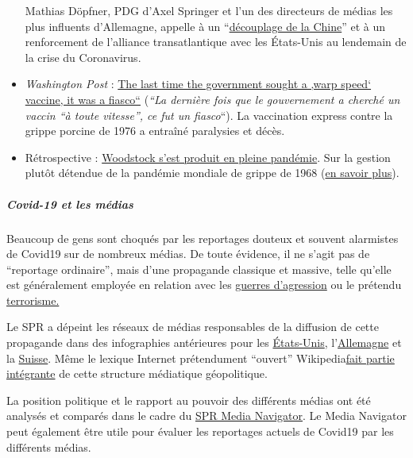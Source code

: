 \begin{itemize}
  Mathias Döpfner, PDG d'Axel Springer et l'un des directeurs de médias
  les plus influents d'Allemagne, appelle à un
  ``\href{https://www.german-foreign-policy.com/news/detail/8263/}{découplage
  de la Chine}'' et à un renforcement de l'alliance transatlantique avec
  les États-Unis au lendemain de la crise du Coronavirus.
\item
  \emph{Washington Post} :
  \href{https://www.washingtonpost.com/history/2020/05/01/vaccine-swine-flu-coronavirus/}{The
  last time the government sought a ‚warp speed` vaccine, it was a
  fiasco``} (\emph{``La dernière fois que le gouvernement a cherché un
  vaccin ``à toute vitesse'', ce fut un fiasco}``). La vaccination
  express contre la grippe porcine de 1976 a entraîné paralysies et
  décès.
\item
  Rétrospective :
  \href{https://www.aier.org/article/woodstock-occurred-in-the-middle-of-a-pandemic/}{Woodstock
  s'est produit en pleine pandémie}. Sur la gestion plutôt détendue de
  la pandémie mondiale de grippe de 1968
  (\href{https://www.britannica.com/event/Hong-Kong-flu-of-1968}{en
  savoir plus}).
\end{itemize}

\hypertarget{covid-19-et-les-muxe9dias}{%
\subparagraph{\texorpdfstring{\textbf{Covid-19 et les
médias}}{Covid-19 et les médias}}\label{covid-19-et-les-muxe9dias}}

Beaucoup de gens sont choqués par les reportages douteux et souvent
alarmistes de Covid19 sur de nombreux médias. De toute évidence, il ne
s'agit pas de ``reportage ordinaire'', mais d'une propagande classique
et massive, telle qu'elle est généralement employée en relation avec les
\href{https://swprs.org/propaganda-in-the-war-on-yugoslavia/}{guerres
d'agression} ou le prétendu
\href{https://www.motherjones.com/politics/2013/01/terror-factory-fbi-trevor-aaronson-book/}{terrorisme.}

Le SPR a dépeint les réseaux de médias responsables de la diffusion de
cette propagande dans des infographies antérieures pour les
\href{https://swprs.org/the-american-empire-and-its-media/}{États-Unis},
l'\href{https://swprs.org/netzwerk-medien-deutschland/}{Allemagne} et la
\href{https://swprs.org/netzwerk-medien-schweiz/}{Suisse}. Même le
lexique Internet prétendument ``ouvert''
Wikipedia\href{https://swprs.org/wikipedia-disinformation-operation/}{fait
partie intégrante} de cette structure médiatique géopolitique.

La position politique et le rapport au pouvoir des différents médias ont
été analysés et comparés dans le cadre du
\href{https://swprs.org/media-navigator/}{SPR Media Navigator}. Le Media
Navigator peut également être utile pour évaluer les reportages actuels
de Covid19 par les différents médias.

